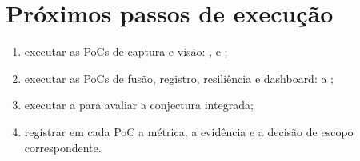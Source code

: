 \section{Próximos passos de execução}
\begin{enumerate}
\item executar as PoCs de captura e visão: ,  e ;
\item executar as PoCs de fusão, registro, resiliência e dashboard:  a ;
\item executar a  para avaliar a conjectura integrada;
\item registrar em cada PoC a métrica, a evidência e a decisão de escopo correspondente.
\end{enumerate}
